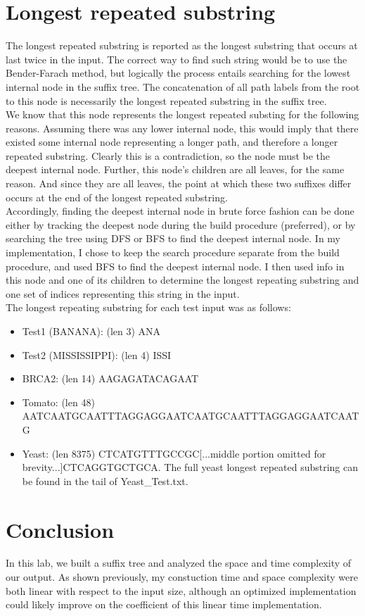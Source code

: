 \documentclass[12pt]{article}
\begin{document}
\section{Longest repeated substring}
The longest repeated substring is reported as the longest substring that occurs at last twice in the input. The correct way to find such string would
be to use the Bender-Farach method, but logically the process entails searching for the lowest internal node in the suffix tree. The concatenation
of all path labels from the root to this node is necessarily the longest repeated substring in the suffix tree. \\
We know that this node represents the longest repeated substing for the following reasons. Assuming there was any lower internal
node, this would imply that there existed some internal node representing a longer path, and therefore a longer repeated substring. Clearly
this is a contradiction, so the node must be the deepest internal node. Further, this node's children are all leaves, for the same reason. And since
they are all leaves, the point at which these two suffixes differ occurs at the end of the longest repeated substring. \\
Accordingly, finding the deepest internal node in brute force fashion can be done either by tracking the deepest node during the build procedure (preferred),
or by searching the tree using DFS or BFS to find the deepest internal node. In my implementation, I chose to keep the search procedure separate
from the build procedure, and used BFS to find the deepest internal node. I then used info in this node and one of its children to determine 
the longest repeating substring and one set of indices representing this string in the input. \\

The longest repeating substring for each test input was as follows: \\

\begin{itemize}
\item Test1 (BANANA): (len 3) ANA
\item Test2 (MISSISSIPPI): (len 4) ISSI
\item BRCA2: (len 14) AAGAGATACAGAAT
\item Tomato: (len 48) AATCAATGCAATTTAGGAGGAATCAATGCAATTTAGGAGGAATCAATG
\item Yeast: (len 8375) CTCATGTTTGCCGC[...middle portion omitted for brevity...]CTCAGGTGCTGCA. The full yeast longest repeated substring can be found in the tail of Yeast\_Test.txt.
\end{itemize}
\section{Conclusion}
In this lab, we built a suffix tree and analyzed the space and time complexity of our output. As shown previously, my constuction time and space complexity were both
linear with respect to the input size, although an optimized implementation could likely improve on the coefficient of this linear time implementation.
\end{document}
